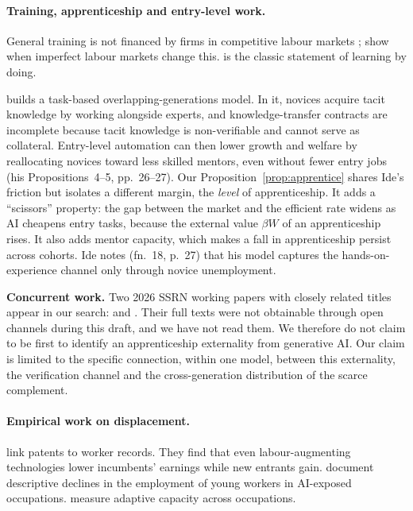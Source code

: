 \documentclass[12pt]{article}
\theoremstyle{remark}
\begin{document}
\paragraph{Training, apprenticeship and entry-level work.} General training is not financed by firms in competitive labour markets \citep{becker1962investment}; \citet{acemoglu1998train,acemoglu1999becker} show when imperfect labour markets change this. \citet{arrow1962learning} is the classic statement of learning by doing.

\citet{ide2025automation} builds a task-based overlapping-generations model. In it, novices acquire tacit knowledge by working alongside experts, and knowledge-transfer contracts are incomplete because tacit knowledge is non-verifiable and cannot serve as collateral. Entry-level automation can then lower growth and welfare by reallocating novices toward less skilled mentors, even without fewer entry jobs (his Propositions~4--5, pp.~26--27). Our Proposition~\ref{prop:apprentice} shares Ide's friction but isolates a different margin, the \emph{level} of apprenticeship. It adds a ``scissors'' property: the gap between the market and the efficient rate widens as AI cheapens entry tasks, because the external value $\beta W$ of an apprenticeship rises. It also adds mentor capacity, which makes a fall in apprenticeship persist across cohorts. Ide notes (fn.~18, p.~27) that his model captures the hands-on-experience channel only through novice unemployment.

\textbf{Concurrent work.} Two 2026 SSRN working papers with closely related titles appear in our search: \citet{akin2026apprenticeship} and \citet{singh2026apprenticeship}. Their full texts were not obtainable through open channels during this draft, and we have not read them. We therefore do not claim to be first to identify an apprenticeship externality from generative AI. Our claim is limited to the specific connection, within one model, between this externality, the verification channel and the cross-generation distribution of the scarce complement.

\paragraph{Empirical work on displacement.} \citet{kogan2023displacement} link patents to worker records. They find that even labour-augmenting technologies lower incumbents' earnings while new entrants gain. \citet[August 2026 version]{brynjolfsson2025canaries} document descriptive declines in the employment of young workers in AI-exposed occupations. \citet{manning2026adaptable} measure adaptive capacity across occupations.
\end{document}
